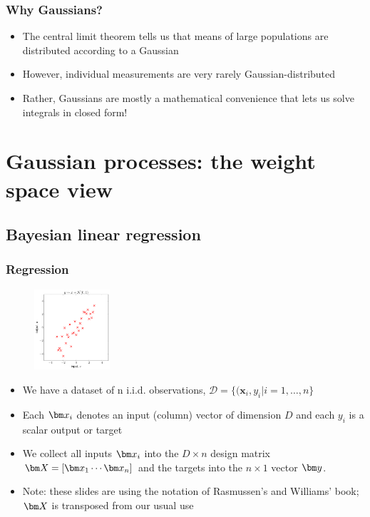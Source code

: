 
\begin{frame}
\frametitle{Why Gaussians?}
\begin{itemize}
\item The central limit theorem tells us that means of large
populations are distributed according to a Gaussian
\item However, individual measurements are very rarely
Gaussian-distributed
\item Rather, Gaussians are mostly a mathematical
convenience that lets us solve integrals in closed form!
\end{itemize}
\end{frame}


\section{Gaussian processes: the weight space view}
\subsection{Bayesian linear regression}
\begin{frame}
\frametitle{Regression}
\begin{figure}
    \includegraphics[width=0.25\textwidth]{images/plots/w_space_maximum_likelihood_001.pdf}
\end{figure}
\begin{itemize}
	\item We have a dataset of n i.i.d. observations, $\mathcal{D} = \{(\bm{x}_i, y_i | i = 1, \ldots ,n\}$
	\item Each $\bx_i$ denotes an input (column) vector of dimension $D$ and each $y_i$ is a scalar output or target
	\item We collect all inputs $\bx_i$ into the $D \times n$ design matrix 
	$\bX = [\bx_1 \cdots \bx_n]$  and the targets into the $n \times 1$ vector $\by$.
	\item Note: these slides are using the notation of Rasmussen's and Williams' book; $\bX$ is transposed from our usual use
\end{itemize}
\end{frame}

